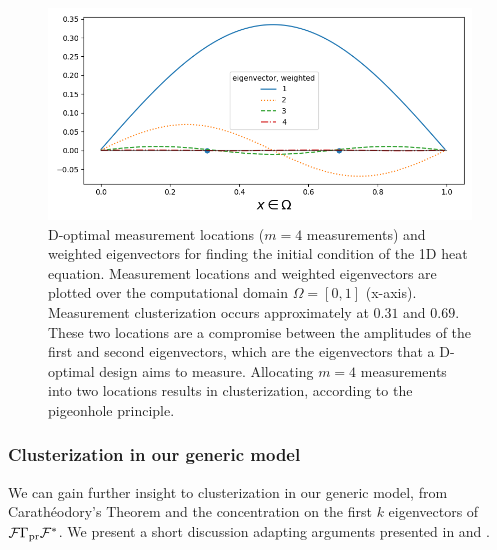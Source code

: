 \begin{figure}\label{fig:eigenvectors}
    \centering
    \includegraphics[width=\textwidth]{figs/eigenvectors_dst_scaled.png}
    \caption{D-optimal measurement locations ($m=4$ measurements) and
      weighted eigenvectors for finding the initial condition of the
      1D heat equation. Measurement locations and weighted
      eigenvectors are plotted over the computational domain $\Omega =
      [0, 1]$ (x-axis). Measurement clusterization occurs
      approximately at $0.31$ and $0.69$. These two locations are a
      compromise between the amplitudes of the first and second
      eigenvectors, which are the eigenvectors that a D-optimal design
      aims to measure. Allocating $m=4$ measurements into two
      locations results in clusterization, according to the pigeonhole
      principle.}
  \label{fig:why}
\end{figure}



\subsubsection{Clusterization in our generic model}\label{subsub:cara}
We can gain further insight to clusterization in our generic model,
from Carath\'eodory's Theorem and the concentration on the first $k$
eigenvectors of $\mathcal{F} \Gamma_{\textup{pr}} \mathcal{F}^*$. We present a short discussion
adapting arguments presented in \cite[Chapter 3]{silvey1980} and
\cite[Section 5.2.3]{pronzatoPazman2013}.

